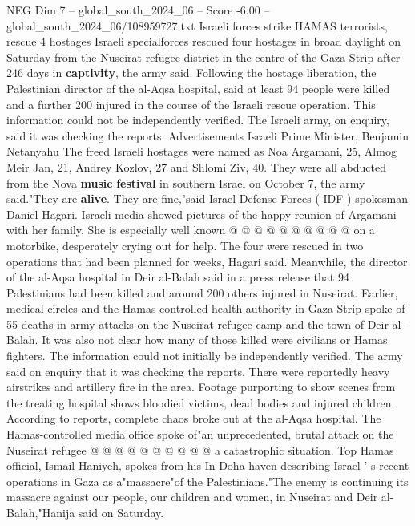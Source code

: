 \begin{textsample}{NEG Dim 7 – global\_south\_2024\_06 – Score -6.00 – global\_south\_2024\_06/108959727.txt}  \label{ex:f7_neg_362}
Israeli forces strike HAMAS terrorists, rescue 4 hostages Israeli specialforces rescued four hostages in broad daylight on Saturday from the Nuseirat refugee district in the centre of the Gaza Strip after 246 days in \textbf{captivity}, the army said.
Following the hostage liberation, the Palestinian director of the al-Aqsa hospital, said at least 94 people were killed and a further 200 injured in the course of the Israeli rescue operation.
This information could not be independently verified.
The Israeli army, on enquiry, said it was checking the reports.
Advertisements Israeli Prime Minister, Benjamin Netanyahu The freed Israeli hostages were named as Noa Argamani, 25, Almog Meir Jan, 21, Andrey Kozlov, 27 and Shlomi Ziv, 40.
They were all abducted from the Nova \textbf{music} \textbf{festival} in southern Israel on October 7, the army said."They are \textbf{alive}.
They are fine,"said Israel Defense Forces ( IDF ) spokesman Daniel Hagari.
Israeli media showed pictures of the happy reunion of Argamani with her family.
She is especially well known @ @ @ @ @ @ @ @ @ @ on a motorbike, desperately crying out for help.
The four were rescued in two operations that had been planned for weeks, Hagari said.
Meanwhile, the director of the al-Aqsa hospital in Deir al-Balah said in a press release that 94 Palestinians had been killed and around 200 others injured in Nuseirat.
Earlier, medical circles and the Hamas-controlled health authority in Gaza Strip spoke of 55 deaths in army attacks on the Nuseirat refugee camp and the town of Deir al-Balah.
It was also not clear how many of those killed were civilians or Hamas fighters.
The information could not initially be independently verified.
The army said on enquiry that it was checking the reports.
There were reportedly heavy airstrikes and artillery fire in the area.
Footage purporting to show scenes from the treating hospital shows bloodied victims, dead bodies and injured children.
According to reports, complete chaos broke out at the al-Aqsa hospital.
The Hamas-controlled media office spoke of"an unprecedented, brutal attack on the Nuseirat refugee @ @ @ @ @ @ @ @ @ @ a catastrophic situation.
Top Hamas official, Ismail Haniyeh, spokes from his In Doha haven describing Israel ' s recent operations in Gaza as a"massacre"of the Palestinians."The enemy is continuing its massacre against our people, our children and women, in Nuseirat and Deir al-Balah,"Hanija said on Saturday.

\end{textsample}
